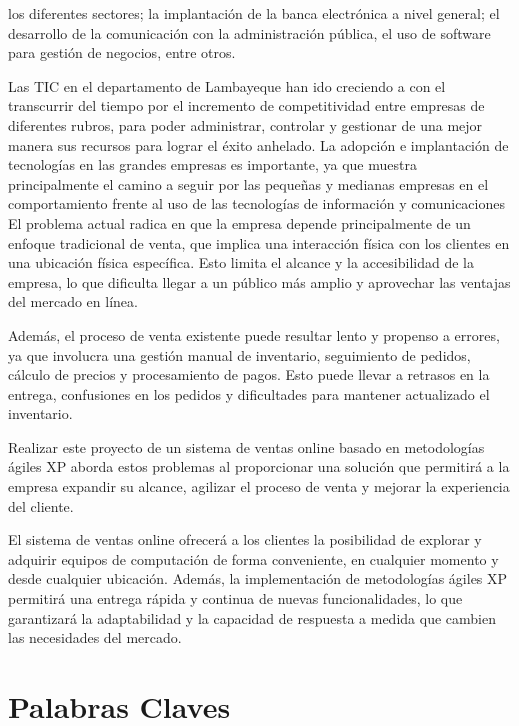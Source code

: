 \documentclass[12pt,a4paper]{article}
\newcommand{\espacio}{\par\vspace{3mm}}
\newcommand{\newsection}[1]{\section{\hspace{6mm} #1}}%
\newcommand{\empresa}{Pantera Digital World S.A.C. }
\newcommand{\titulo}{"Propuesta de implementación de un Sistema de Comercio Electrónico Para la Venta de Equipos y Accesorios de Cómputo" }
\begin{document}
\espacio los diferentes sectores; la implantación de la banca electrónica a nivel general; el desarrollo de la comunicación con la administración pública, el uso de software para gestión de negocios, entre otros.
\espacio Las TIC en el departamento de Lambayeque han ido creciendo a con el transcurrir del tiempo por el incremento de competitividad entre empresas de diferentes rubros, para poder administrar, controlar y gestionar de una mejor manera sus recursos para lograr el éxito anhelado. La adopción e implantación de tecnologías en las grandes empresas es importante, ya que muestra principalmente el camino a seguir por las pequeñas y medianas empresas en el comportamiento frente al uso de las tecnologías de información y comunicaciones
El problema actual radica en que la empresa depende principalmente de un enfoque tradicional de venta, que implica una interacción física con los clientes en una ubicación física específica. Esto limita el alcance y la accesibilidad de la empresa, lo que dificulta llegar a un público más amplio y aprovechar las ventajas del mercado en línea.
\espacio
Además, el proceso de venta existente puede resultar lento y propenso a errores, ya que involucra una gestión manual de inventario, seguimiento de pedidos, cálculo de precios y procesamiento de pagos. Esto puede llevar a retrasos en la entrega, confusiones en los pedidos y dificultades para mantener actualizado el inventario.
\espacio
Realizar este proyecto de un sistema de ventas online basado en metodologías ágiles XP aborda estos problemas al proporcionar una solución que permitirá a la empresa expandir su alcance, agilizar el proceso de venta y mejorar la experiencia del cliente.
\espacio
El sistema de ventas online ofrecerá a los clientes la posibilidad de explorar y adquirir equipos de computación de forma conveniente, en cualquier momento y desde cualquier ubicación. Además, la implementación de metodologías ágiles XP permitirá una entrega rápida y continua de nuevas funcionalidades, lo que garantizará la adaptabilidad y la capacidad de respuesta a medida que cambien las necesidades del mercado.
\newpage
\newsection{Palabras Claves}
\end{document}
